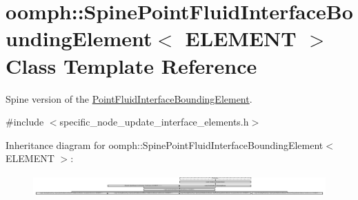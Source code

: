 \hypertarget{classoomph_1_1SpinePointFluidInterfaceBoundingElement}{}\section{oomph\+:\+:Spine\+Point\+Fluid\+Interface\+Bounding\+Element$<$ E\+L\+E\+M\+E\+NT $>$ Class Template Reference}
\label{classoomph_1_1SpinePointFluidInterfaceBoundingElement}


Spine version of the \hyperlink{classoomph_1_1PointFluidInterfaceBoundingElement}{Point\+Fluid\+Interface\+Bounding\+Element}.  




{\ttfamily \#include $<$specific\+\_\+node\+\_\+update\+\_\+interface\+\_\+elements.\+h$>$}

Inheritance diagram for oomph\+:\+:Spine\+Point\+Fluid\+Interface\+Bounding\+Element$<$ E\+L\+E\+M\+E\+NT $>$\+:\begin{figure}[H]
\begin{center}
\leavevmode
\includegraphics[height=0.824499cm]{classoomph_1_1SpinePointFluidInterfaceBoundingElement}
\end{center}
\end{figure}
